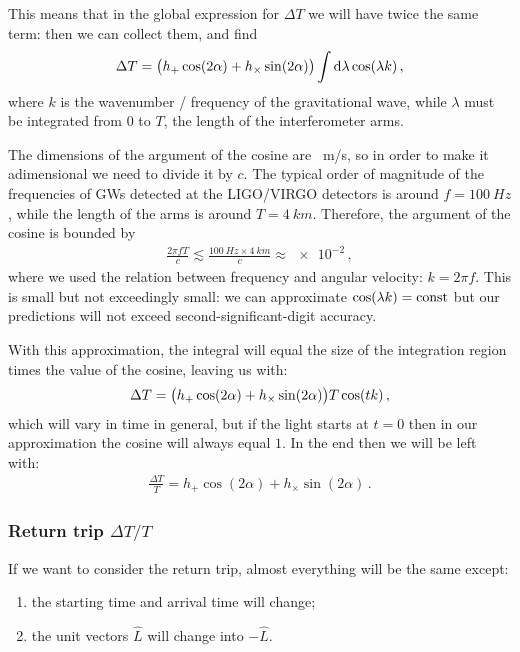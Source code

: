 \documentclass[main.tex]{subfiles}
\begin{document}
This means that in the global expression for \(\Delta T\) we will have twice the same term: then we can collect them, and find 
%
\begin{align}
\Delta T = \qty(h_{+} \cos(2 \alpha ) + h_{ \times } \sin(2 \alpha )) \int \dd{\lambda } \cos(\lambda k)
\,,
\end{align}
%
where \(k\) is the wavenumber / frequency of the gravitational wave, while \(\lambda \) must be integrated from 0 to \(T\), the length of the interferometer arms. 

The dimensions of the argument of the cosine are \SI{}{m/s}, so in order to make it adimensional we need to divide it by \(c\). The typical order of magnitude of the frequencies of GWs detected at the LIGO/VIRGO detectors is around \(f = \SI{100}{Hz}\), while the length of the arms is around \(T =\SI{4}{km}\). Therefore, the argument of the cosine is bounded by 
%
\begin{align}
\frac{2 \pi f T }{c} \lesssim \frac{\SI{100}{Hz} \times \SI{4}{km}}{c} \approx \num{e-2}
\,,
\end{align}
%
where we used the relation between frequency and angular velocity: \(k = 2 \pi f\). This is small but not exceedingly small: we can approximate \(\cos(\lambda k ) = \text{const}\) but our predictions will not exceed second-significant-digit accuracy. 

With this approximation, the integral will equal the size of the integration region times the value of the cosine, leaving us with: 
%
\begin{align}
\Delta T = \qty(h_{+} \cos(2 \alpha ) + h_{ \times } \sin(2 \alpha )) T \cos(t k)
\,,
\end{align}
%
which will vary in time in general, but if the light starts at \(t=0\) then in our approximation the cosine will always equal \(1\).  In the end  then we will be left with: 
%
\begin{align}
\frac{\Delta T}{T} = h_{+} \cos(2 \alpha ) + h_{ \times } \sin(2 \alpha )
\,.
\end{align}

\subsubsection{Return trip \(\Delta T / T\)}

If we want to consider the return trip, almost everything will be the same except: 
\begin{enumerate}
  \item the starting time and arrival time will change;\label{it:starting-time}
  \item the unit vectors \(\hat{L}\) will change into \(- \hat{L}\). \label{it:parity}
\end{enumerate}
\end{document}
